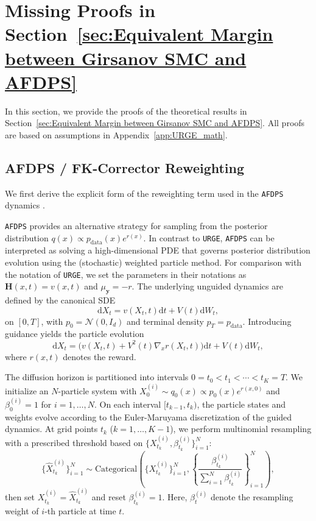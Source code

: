 \documentclass{article}
\theoremstyle{plain}
\theoremstyle{definition}
\theoremstyle{remark}
\newcommand{\dif}{{\mathrm{d}}}
\begin{document}
\section{Missing Proofs in Section~\ref{sec:Equivalent Margin between Girsanov SMC and AFDPS}}
\label{sec:Proofs in Section Equivalent Margin between Girsanov SMC and AFDPS}

In this section, we provide the proofs of the theoretical results in Section~\ref{sec:Equivalent Margin between Girsanov SMC and AFDPS}.
All proofs are based on assumptions in Appendix~\ref{app:URGE_math}.

\subsection{AFDPS / FK-Corrector Reweighting}
\label{sec:AFDPS reweighting function}

We first derive the explicit form of the reweighting term used in the \texttt{AFDPS} dynamics \cite{chen2025solving}.

\texttt{AFDPS} provides an alternative strategy for sampling from the posterior distribution $q(x)\propto p_{\text{data}}(x)e^{r(x)}$. In contrast to \texttt{URGE}, \texttt{AFDPS} can be interpreted as solving a high-dimensional PDE that governs posterior distribution evolution using the (stochastic) weighted particle method. For comparison with the notation of \texttt{URGE}, we set the parameters in their notations as \(\bm{H}(x,t)=v(x,t)\) and \(\mu_{\bm{y}}=-r\). The underlying unguided dynamics are defined by the canonical SDE \[\dif X_t = v(X_t,t) \dif t + V(t) \dif W_t,\] on $[0,T]$, with $p_0=\mathcal{N}(0,I_d)$ and terminal density $p_T=p_{\text{data}}$. Introducing guidance yields the particle evolution
\[
\dif X_t = \bigl(v(X_t,t) + V^2(t)\nabla_x r(X_t,t)\bigr) \dif t + V(t) \dif W_t,
\]
where $r(x,t)$ denotes the reward. 

{The diffusion horizon is partitioned into intervals $0=t_0<t_1<\cdots<t_K=T$. We initialize an $N$-particle system with $X^{(i)}_0\sim q_0(x)\propto p_0(x)e^{r(x,0)}$ and $\beta^{(i)}_0=1$ for $i=1,\dots,N$. On each interval $[t_{k-1},t_k)$, the particle states and weights evolve according to the Euler-Maruyama discretization of the guided dynamics. At grid points $t_k$ ($k=1,\dots,K-1$), we perform multinomial resampling with a prescribed threshold based on $\{X^{(i)}_{t_k},\beta^{(i)}_{t_k}\}_{i=1}^N$: 
\[
\{\widehat X^{(i)}_{t_k}\}_{i=1}^N \sim \mathrm{Categorical}\left(\{X^{(i)}_{t_k}\}_{i=1}^N,\left\{\frac{\beta^{(i)}_{t_k}}{\sum_{i=1}^N \beta^{(i)}_{t_k}}\right\}_{i=1}^N\right),
\]
then set $X^{(i)}_{t_k}=\widehat X^{(i)}_{t_k}$ and reset $\beta^{(i)}_{t_k}=1$.} Here, \(\beta^{(i)}_{t}\) denote the resampling weight of \(i\)-th particle at time \(t\).
\end{document}
